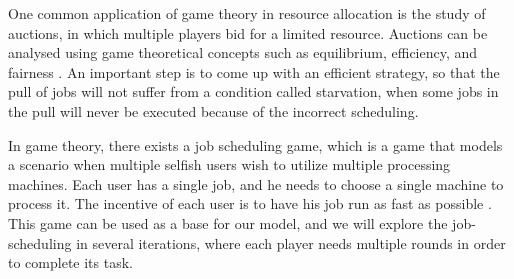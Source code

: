 One common application of game theory in resource allocation is the study of auctions, 
in which multiple players bid for a limited resource. Auctions can be analysed using 
game theoretical concepts such as equilibrium, efficiency, and fairness \cite{9244046}. 
An important step is to come up with an efficient strategy, so that the pull of jobs
will not suffer from a condition called starvation, when some jobs in the pull will
never be executed because of the incorrect scheduling.

In game theory, there exists a job scheduling game, which is a game that models a 
scenario when multiple selfish users wish to utilize multiple processing machines. 
Each user has a single job, and he needs to choose a single machine to process it. 
The incentive of each user is to have his job run as fast as possible \cite{noauthor_job_2021}. 
This game can be used as a base for our model, and we will explore the job-scheduling 
in several iterations, where each player needs multiple rounds in order to complete its task.